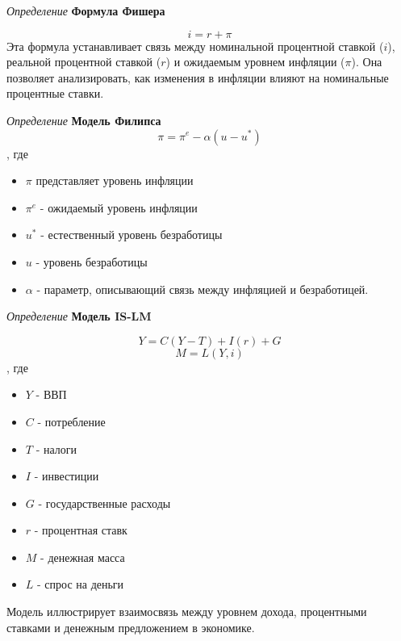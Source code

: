 \textit{Определение }\textbf{Формула Фишера}

   \[
   i = r + \pi
   \]
   Эта формула устанавливает связь между номинальной процентной ставкой (\(i\)), реальной процентной ставкой (\(r\)) и ожидаемым уровнем инфляции (\(\pi\)). Она позволяет анализировать, как изменения в инфляции влияют на номинальные процентные ставки.


\textit{Определение }\textbf{Модель Филипса}
   \[
   \pi = \pi^e - \alpha(u - u^*)
   \]
, где
\begin{itemize}
   \item \(\pi\) представляет уровень инфляции
   \item \(\pi^e\) - ожидаемый уровень инфляции
   \item  \(u^*\) - естественный уровень безработицы
   \item \(u\) - уровень безработицы
   \item \(\alpha\) - параметр, описывающий связь между инфляцией и безработицей.
\end{itemize} 



\textit{Определение } \textbf{Модель IS-LM}



   \[
   Y = C(Y - T) + I(r) + G
   \]
   \[
   M = L(Y, i)
   \],   
где 
\begin{itemize}
   \item \(Y\) - ВВП
   \item  \(C\) - потребление
   \item  \(T\) - налоги
   \item \(I\) - инвестиции
   \item  \(G\) - государственные расходы
   \item  \(r\) - процентная ставк
   \item  \(M\) - денежная масса
   \item  \(L\) - спрос на деньги
\end{itemize}

Модель иллюстрирует взаимосвязь между уровнем дохода, процентными ставками и денежным предложением в экономике.
